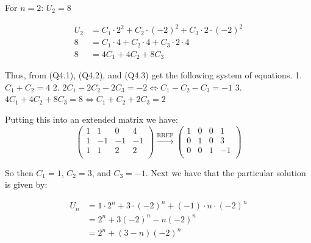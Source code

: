 \documentclass{article}
\begin{document}
\begin{enumerate}[(a)]
            For $n = 2$: $U_2 = 8$

            \begin{align*}
                U_2 &= C_1 \cdot 2^2 + C_2 \cdot (-2)^2 + C_3 \cdot 2 \cdot (-2)^2 \\
                8 &= C_1 \cdot 4 + C_2 \cdot 4 + C_3 \cdot 2 \cdot 4 \\
                8 &= 4C_1 + 4C_2 + 8C_3 \tag{Q4.3}
            \end{align*}
           

            Thus, from (Q4.1), (Q4.2), and (Q4.3) get the following system of equations.
            1. $C_1 + C_2 = 4$
            2. $2C_1 - 2C_2 - 2C_3 = -2 \iff C_1 - C_2 - C_3 = -1$
            3. $4C_1 + 4C_2 + 8C_3 = 8 \iff C_1 + C_2 + 2C_3 = 2$

            Putting this into an extended matrix we have:
            $$ \begin{pmatrix}
            1 & 1 & 0 & 4 \\
            1 & -1 & -1 & -1 \\
            1& 1& 2& 2 \\
            \end{pmatrix} \xrightarrow{\text{RREF}}
            \begin{pmatrix}
            1 & 0 & 0 & 1 \\
            0 & 1 & 0 & 3 \\
            0 & 0 & 1 & -1 \\
            \end{pmatrix} $$

            So then $C_1 = 1$, $C_2 = 3$, and $C_3 = -1$. Next we have that the particular solution is given by:

            \begin{align*}
                U_n &= 1 \cdot 2^n + 3 \cdot (-2)^n + (-1) \cdot n \cdot (-2)^n \\
                &= 2^n + 3(-2)^n - n(-2)^n \\
                &= 2^n + (3 - n)(-2)^n \tag{Q4(b) Ans}
            \end{align*}


\end{enumerate}
\end{document}
